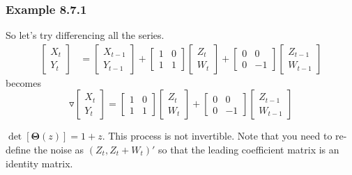 \documentclass{beamer}
\begin{document}

\begin{frame}
\frametitle{Example 8.7.1}

So let's try differencing all the series. 
\begin{align*}
\left[\begin{array}{c}
X_t \\
Y_t
\end{array}\right]
&=
\left[\begin{array}{c}
X_{t-1} \\
Y_{t-1}
\end{array}\right]
+
\left[\begin{array}{cc}
1 & 0 \\
1 & 1
\end{array}\right]
\left[\begin{array}{c}
Z_{t} \\
W_{t}
\end{array}\right]
+
\left[\begin{array}{cc}
0 & 0 \\
0 & -1
\end{array}\right]
\left[\begin{array}{c}
Z_{t-1} \\
W_{t-1}
\end{array}\right]
\end{align*}
becomes
$$
\triangledown 
\left[\begin{array}{c}
X_t \\
Y_t
\end{array}\right]
=
\left[\begin{array}{cc}
1 & 0 \\
1 & 1
\end{array}\right]
\left[\begin{array}{c}
Z_{t} \\
W_{t}
\end{array}\right]
+
\left[\begin{array}{cc}
0 & 0 \\
0 & -1
\end{array}\right]
\left[\begin{array}{c}
Z_{t-1} \\
W_{t-1}
\end{array}\right]
$$
\pause

$\det[\bm{\Theta}(z)] = 1+z$. This process is not invertible. Note that you need to re-define the noise as $(Z_t, Z_{t} + W_t)'$ so that the leading coefficient matrix is an identity matrix.
\end{frame}
\end{document}

